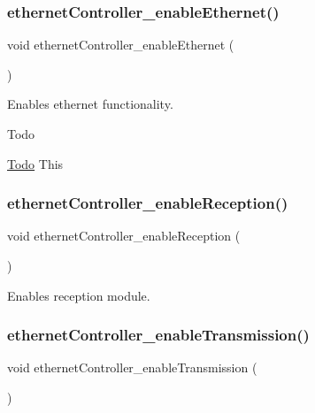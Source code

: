 \subsubsection{\texorpdfstring{ethernetController\_enableEthernet()}{ethernetController\_enableEthernet()}}
{\footnotesize\ttfamily void ethernet\+Controller\+\_\+enable\+Ethernet (\begin{DoxyParamCaption}{ }\end{DoxyParamCaption})}



Enables ethernet functionality. 

\begin{DoxyRefDesc}{Todo}
\item[\mbox{\hyperlink{todo__todo000006}{Todo}}]This \end{DoxyRefDesc}
\mbox{\label{group__init_ga203eb473ea1d221ffe97839b16e74565}} 
\subsubsection{\texorpdfstring{ethernetController\_enableReception()}{ethernetController\_enableReception()}}
{\footnotesize\ttfamily void ethernet\+Controller\+\_\+enable\+Reception (\begin{DoxyParamCaption}{ }\end{DoxyParamCaption})}



Enables reception module. 

\mbox{\label{group__init_ga0aef586bd9434125367071595a794806}} 
\subsubsection{\texorpdfstring{ethernetController\_enableTransmission()}{ethernetController\_enableTransmission()}}
{\footnotesize\ttfamily void ethernet\+Controller\+\_\+enable\+Transmission (\begin{DoxyParamCaption}{ }\end{DoxyParamCaption})}



